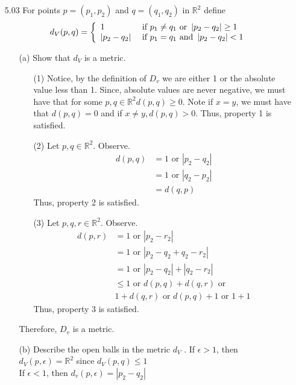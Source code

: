 \documentclass[12pt]{article}
\newcommand{\R}{\mathbb{R}}
\begin{document}
\begin{enumerate}
		\item[5.03] For points $p = \left( p _ { 1 } , p _ { 2 } \right)$ and $q = \left( q _ { 1 } , q _ { 2 } \right)$ in $\mathbb { R } ^ { 2 }$ define
		\[d _ { V } ( p , q ) = \left\{ \begin{array} { l l } { 1 } & { \text { if } p _ { 1 } \neq q _ { 1 } \text { or } \left| p _ { 2 } - q _ { 2 } \right| \geq 1 } \\ { \left| p _ { 2 } - q _ { 2 } \right| } & { \text { if } p _ { 1 } = q _ { 1 } \text { and } \left| p _ { 2 } - q _ { 2 } \right| < 1 } \end{array} \right.\]
		\begin{enumerate}
			\item[(a)] Show that $d _ { V }$ is a metric.
			\begin{enumerate}
				\item[(1)]
				Notice, by the definition of $ D_v $ we are either 1 or the absolute value less than 1. Since, absolute values are never negative, we must have that for some $ p,q\in \R^2 d(p,q)\geq0$. Note if $ x = y $, we must have that $ d(p,q)=0 $ and if $ x\not=y,d(p,q)>0 $.
				Thus, property 1 is satisfied.
				\item[(2)] Let $ p,q\in\R^2 $. Observe.
				\begin{align*}
				d(p,q) &= 1 \text{ or } |p_2-q_2|\\
				&= 1 \text{ or } |q_2-p_2|\\
				&= d(q,p)
				\end{align*}
				Thus, property 2 is satisfied.
				\item[(3)] Let $ p,q,r\in\R^2 $. Observe.
				\begin{align*}
				d(p,r) &=1 \text{ or } |p_2-r_2|\\
				&=1 \text{ or } |p_2-q_2+q_2-r_2|\\
				&= 1 \text{ or } |p_2-q_2|+|q_2-r_2|\\
				&\leq 1 \text { or } d(p,q)+d(q,r) \text{ or } \\
				&   1 + d(q,r) \text{ or } d(p,q) + 1 \text{ or } 1 + 1
				\end{align*}
				Thus, property 3 is satisfied.
			\end{enumerate}
			Therefore, $ D_v $ is a metric.
			\item[(b)] 	Describe the open balls in the metric $d _ { V }$ .
			If $ \epsilon > 1$, then $ d_V(p,\epsilon) = \R^2 $ since $ d_V(p,q)\leq 1 $\\
			If $ \epsilon < 1 $, then $ d_v(p,\epsilon) = |p_2-q_2| $

\end{enumerate}
\end{enumerate}
\end{document}
